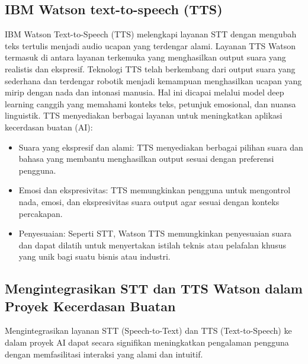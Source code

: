 \documentclass{article}
\begin{document}
\subsection{IBM Watson text-to-speech (TTS)}
IBM Watson Text-to-Speech (TTS) melengkapi layanan STT dengan mengubah teks tertulis menjadi audio ucapan yang terdengar alami. Layanan TTS Watson termasuk di antara layanan terkemuka yang menghasilkan output suara yang realistis dan ekspresif. Teknologi TTS telah berkembang dari output suara yang sederhana dan terdengar robotik menjadi kemampuan menghasilkan ucapan yang mirip dengan nada dan intonasi manusia. Hal ini dicapai melalui model deep learning canggih yang memahami konteks teks, petunjuk emosional, dan nuansa linguistik.
TTS menyediakan berbagai layanan untuk meningkatkan aplikasi kecerdasan buatan (AI):
\begin{itemize}
    \item Suara yang ekspresif dan alami: TTS menyediakan berbagai pilihan suara dan bahasa yang membantu menghasilkan output sesuai dengan preferensi pengguna.
    \item Emosi dan ekspresivitas: TTS memungkinkan pengguna untuk mengontrol nada, emosi, dan ekspresivitas suara output agar sesuai dengan konteks percakapan.
    \item Penyesuaian: Seperti STT, Watson TTS memungkinkan penyesuaian suara dan dapat dilatih untuk menyertakan istilah teknis atau pelafalan khusus yang unik bagi suatu bisnis atau industri.
\end{itemize}

\subsection{Mengintegrasikan STT dan TTS Watson dalam Proyek Kecerdasan Buatan}
Mengintegrasikan layanan STT (Speech-to-Text) dan TTS (Text-to-Speech) ke dalam proyek AI dapat secara signifikan meningkatkan pengalaman pengguna dengan memfasilitasi interaksi yang alami dan intuitif.
\end{document}
